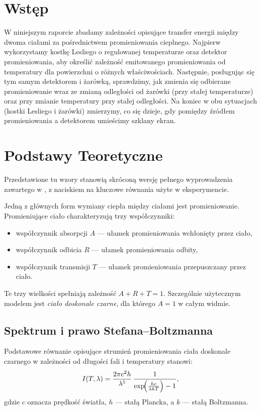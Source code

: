\documentclass[12pt]{article}
\begin{document}
\newpage
\section{Wstęp}
W niniejszym raporcie zbadamy zależności opisujące transfer energii między dwoma ciałami za pośrednictwem promieniowania cieplnego. Najpierw wykorzystamy kostkę Lesliego o regulowanej temperaturze oraz detektor promieniowania, aby określić zależność emitowanego promieniowania od temperatury dla powierzchni o różnych właściwościach. Następnie, posługując się tym samym detektorem i żarówką, sprawdzimy, jak zmienia się odbierane promieniowanie wraz ze zmianą odległości od żarówki (przy stałej temperaturze) oraz przy zmianie temperatury przy stałej odległości. Na koniec w obu sytuacjach (kostki Lesliego i żarówki) zmierzymy, co się dzieje, gdy pomiędzy źródłem promieniowania a detektorem umieścimy szklany ekran.

\section{Podstawy Teoretyczne}
Przedstawione tu wzory stanowią skróconą wersję pełnego wyprowadzenia zawartego w \cite{skrypt}, z naciskiem na kluczowe równania użyte w eksperymencie.

Jedną z głównych form wymiany ciepła między ciałami jest promieniowanie. Promieniujące ciało charakteryzują trzy współczynniki:
\begin{itemize}[noitemsep]
    \item współczynnik absorpcji $A$ — ułamek promieniowania wchłonięty przez ciało,
    \item współczynnik odbicia $R$ — ułamek promieniowania odbity,
    \item współczynnik transmisji $T$ — ułamek promieniowania przepuszczany przez ciało.
\end{itemize}
Te trzy wielkości spełniają zależność $A + R + T = 1$. Szczególnie użytecznym modelem jest \emph{ciało doskonale czarne}, dla którego $A=1$ w całym widmie.

\subsection{Spektrum i prawo Stefana–Boltzmanna}
Podstawowe równanie opisujące strumień promieniowania ciała doskonale czarnego w zależności od długości fali i temperatury stanowi:
\begin{equation}
	I(T, \lambda) = \frac{2\pi c^2 h}{\lambda^5}\,\frac{1}{\exp\!\Bigl(\tfrac{hc}{\lambda k T}\Bigr)-1},
	\label{eq:emision_spectrum}
\end{equation}
gdzie $c$ oznacza prędkość światła, $h$ — stałą Plancka, a $k$ — stałą Boltzmanna. 
\end{document}
